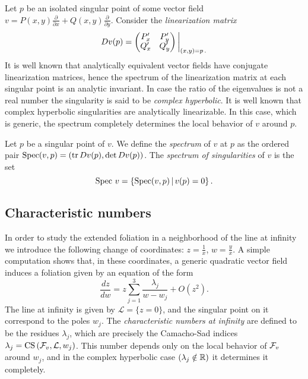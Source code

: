 \documentclass[phd,tocprelim]{cornell}
\begin{document}
Let $p$ be an isolated singular point of some vector field $v = P(x,y)\frac{\partial}{\partial x} + Q(x,y)\frac{\partial}{\partial y}$. Consider the \textit{linearization matrix}
 \[ Dv(p) = 
 \renewcommand*{\arraystretch}{0.65}
  \begin{pmatrix} 
   P'_x & P'_y \\
   Q'_x & Q'_y \\
  \end{pmatrix}\bigg\vert_{(x,y)=p\,.}  
   \]
It is well known that analytically equivalent vector fields have conjugate linearization matrices, hence the spectrum of the linearization matrix at each singular point is an analytic invariant. In case the ratio of the eigenvalues is not a real number the singularity is said to be \textit{complex hyperbolic}. It is well known that complex hyperbolic singularities are analytically linearizable. In this case, which is generic, the spectrum completely determines the local behavior of $v$ around $p$.

\begin{definition}
 Let $p$ be a singular point of $v$. We define the \textit{spectrum} of $v$ at $p$ as the ordered pair $\operatorname{Spec}(v,p) = (\operatorname{tr} Dv(p),\det Dv(p))$. The \textit{spectrum of singularities} of $v$ is the set 
  \[ \operatorname{Spec}\,v = \left\{{\operatorname{Spec}(v,p)}\,\vert\,{v(p)=0}\right\} . \]
\end{definition}


\subsection{Characteristic numbers}

In order to study the extended foliation in a neighborhood of the line at infinity we introduce the following change of coordinates: $z=\displaystyle\frac{1}{x}$, $w=\displaystyle\frac{y}{x}$. A simple computation shows that, in these coordinates, a generic quadratic vector field induces a foliation given by an equation of the form
 \[ \frac{dz}{dw} = z\sum_{j=1}^3 \frac{\lambda_j}{w-w_j} + O(z^2). \]
The line at infinity is given by $\mathcal{L}=\{z=0\}$, and the singular point on it correspond to the poles $w_j$. The \textit{characteristic numbers at infinity} are defined to be the residues $\lambda_j$, which are precisely the Camacho-Sad indices $\lambda_j=\operatorname{CS}\,(\mathcal{F}_v,\mathcal{L},w_j)$. This number depends only on the local behavior of $\mathcal{F}_v$ around $w_j$, and in the complex hyperbolic case $(\lambda_j\notin\mathbb{R})$ it determines it completely.
\end{document}
